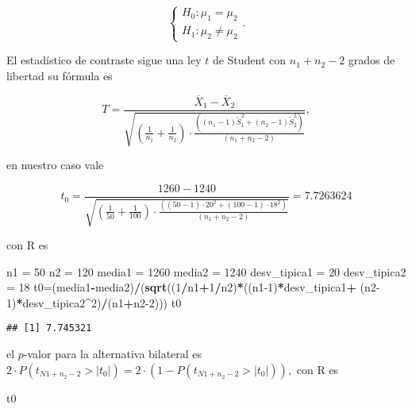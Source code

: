 \documentclass[
]{article}
\newenvironment{Shaded}{\begin{snugshade}}{\end{snugshade}}
\newcommand{\DecValTok}[1]{\textcolor[rgb]{0.00,0.00,0.81}{#1}}
\newcommand{\KeywordTok}[1]{\textcolor[rgb]{0.13,0.29,0.53}{\textbf{#1}}}
\newcommand{\NormalTok}[1]{#1}
\newcommand{\OperatorTok}[1]{\textcolor[rgb]{0.81,0.36,0.00}{\textbf{#1}}}
\newcommand{\StringTok}[1]{\textcolor[rgb]{0.31,0.60,0.02}{#1}}
\begin{document}
\[
\left\{
\begin{array}{ll}
H_{0}:\mu_1=\mu_2\\
H_{1}:\mu_2\not= \mu_2 
\end{array}
\right..
\]

El estadístico de contraste sigue una ley \(t\) de Student con
\(n_1+n_2-2\) grados de libertad su fórmula es

\[
T=\frac{\overline{X}_1-\overline{X}_2}
{\sqrt{(\frac1{n_1}+\frac1{n_2})\cdot 
\frac{((n_1-1)\widetilde{S}_1^2+(n_2-1)\widetilde{S}_2^2)}
{(n_1+n_2-2)}}},
\]

en nuestro caso vale

\[
t_0=\frac{1260-1240}
{\sqrt{(\frac1{50}+\frac1{100})\cdot 
\frac{((50-1)\cdot 20^2+(100-1)\cdot  18^2)}
{(n_1+n_2-2)}}}=7.7263624 
\]

con R es

\begin{Shaded}
\begin{Highlighting}[]
\NormalTok{n1 =}\StringTok{ }\DecValTok{50}
\NormalTok{n2 =}\StringTok{ }\DecValTok{120}
\NormalTok{media1 =}\StringTok{ }\DecValTok{1260}
\NormalTok{media2 =}\StringTok{ }\DecValTok{1240}
\NormalTok{desv\_tipica1 =}\StringTok{ }\DecValTok{20}
\NormalTok{desv\_tipica2 =}\StringTok{ }\DecValTok{18}
\NormalTok{t0=(media1}\OperatorTok{{-}}\NormalTok{media2)}\OperatorTok{/}\NormalTok{(}\KeywordTok{sqrt}\NormalTok{((}\DecValTok{1}\OperatorTok{/}\NormalTok{n1}\OperatorTok{+}\DecValTok{1}\OperatorTok{/}\NormalTok{n2)}\OperatorTok{*}\NormalTok{((n1}\DecValTok{{-}1}\NormalTok{)}\OperatorTok{*}\NormalTok{desv\_tipica1}\OperatorTok{+}
\StringTok{                        }\NormalTok{(n2}\DecValTok{{-}1}\NormalTok{)}\OperatorTok{*}\NormalTok{desv\_tipica2}\OperatorTok{\^{}}\DecValTok{2}\NormalTok{)}\OperatorTok{/}\NormalTok{(n1}\OperatorTok{+}\NormalTok{n2}\DecValTok{{-}2}\NormalTok{)))}
\NormalTok{t0}
\end{Highlighting}
\end{Shaded}

\begin{verbatim}
## [1] 7.745321
\end{verbatim}

el \(p\)-valor para la alternativa bilateral es
\(2\cdot P(t_{N1+n_2-2}>|t_0|)=2\cdot (1-P(t_{N1+n_2-2}>|t_0|)),\) con R
es

\begin{Shaded}
\begin{Highlighting}[]
\NormalTok{t0}
\end{Highlighting}
\end{Shaded}
\end{document}
